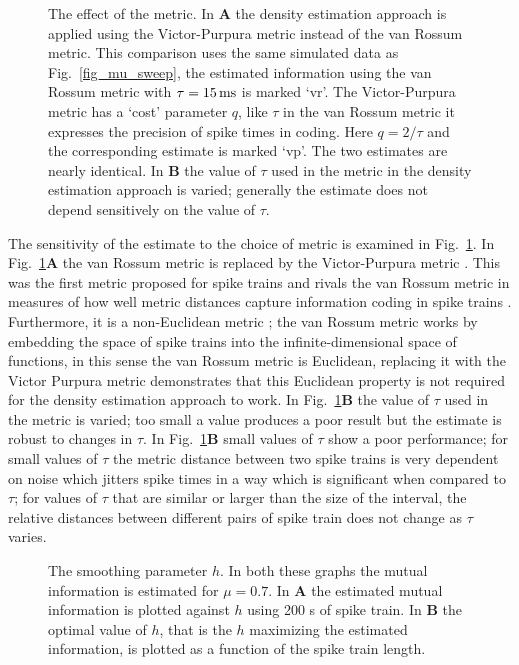 \documentclass[12pt]{article}
\newcommand{\ms}{\mbox{\,ms}}
\begin{document}
\begin{figure}[tp]
\begin{center}

\end{center}
\caption{The effect of the metric. In \textbf{A} the density
  estimation approach is applied using the Victor-Purpura metric
  instead of the van Rossum metric. This comparison uses the same
  simulated data as Fig.~\ref{fig_mu_sweep}, the estimated information
  using the van Rossum metric with $\tau=15\ms$ is marked
  \lq{}vr\rq{}. The Victor-Purpura metric has a \lq{}cost\rq{}
  parameter $q$, like $\tau$ in the van Rossum metric it expresses the
  precision of spike times in coding. Here $q=2/\tau$ and the
  corresponding estimate is marked \lq{}vp\rq{}. The two estimates are
  nearly identical.  In \textbf{B} the value of $\tau$ used in the
  metric in the density estimation approach is varied; generally the
  estimate does not depend sensitively on the value of $\tau$.
 \label{fig_metrics}}
\end{figure}



The sensitivity of the estimate to the choice of metric is examined in
Fig.~\ref{fig_metrics}. In Fig.~\ref{fig_metrics}\textbf{A} the van
Rossum metric is replaced by the Victor-Purpura metric
\citep{VictorPurpura1996}. This was the first metric proposed for spike
trains and rivals the van Rossum metric in measures of how well metric
distances capture information coding in spike trains
\citep{HoughtonVictor2010}. Furthermore, it is a non-Euclidean metric
\citep{AronovVictor2004}; the van Rossum metric works by embedding the space of spike
trains into the infinite-dimensional space of functions, in this sense
the van Rossum metric is Euclidean, replacing it with the Victor
Purpura metric demonstrates that this Euclidean property is not
required for the density estimation approach to work. In
Fig.~\ref{fig_metrics}\textbf{B} the value of $\tau$ used in the
metric is varied; too small a value produces a poor result but the
estimate is robust to changes in $\tau$. In
Fig.~\ref{fig_metrics}\textbf{B} small values of $\tau$ show a poor
performance; for small values of $\tau$ the metric distance between
two spike trains is very dependent on noise which jitters spike times
in a way which is significant when compared to $\tau$; for values of
$\tau$ that are similar or larger than the size of the interval, the
relative distances between different pairs of spike train does not
change as $\tau$ varies.


\begin{figure}[tp]
\begin{center}

\end{center}
\caption{The smoothing parameter $h$. In both these graphs the mutual
  information is estimated for $\mu=0.7$. In \textbf{A} the estimated
  mutual information is plotted against $h$ using 200 s of spike
  train.  In \textbf{B} the optimal value of $h$, that is the $h$
  maximizing the estimated information, is plotted as a function of
  the spike train length.
 \label{fig_h}}
\end{figure}
\end{document}
